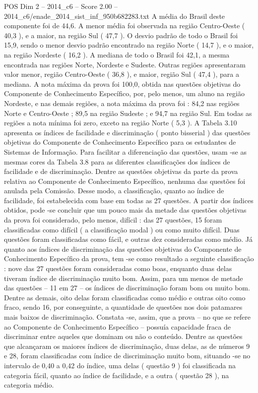 \begin{textsample}{POS Dim 2 – 2014\_c6 – Score 2.00 – 2014\_c6/enade\_2014\_sist\_inf\_950b682283.txt}
A média do Brasil deste componente foi de 44,6.
A menor média foi observada na região Centro-Oeste ( 40,3 ), e a maior, na região Sul ( 47,7 ).
O desvio padrão de todo o Brasil foi 15,9, sendo o menor desvio padrão encontrado na região Norte ( 14,7 ), e o maior, na região Nordeste ( 16,2 ).
A mediana de todo o Brasil foi 42,1, a mesma encontrada nas regiões Norte, Nordeste e Sudeste.
Outras regiões apresentaram valor menor, região Centro-Oeste ( 36,8 ), e maior, região Sul ( 47,4 ), para a mediana.
A nota máxima da prova foi 100,0, obtida nas questões objetivas do Componente de Conhecimento Específico, por, pelo menos, um aluno na região Nordeste, e nas demais regiões, a nota máxima da prova foi : 84,2 nas regiões Norte e Centro-Oeste ; 89,5 na região Sudeste ; e 94,7 na região Sul.
Em todas as regiões a nota mínima foi zero, exceto na região Norte ( 5,3 ).
A Tabela 3.10 apresenta os índices de facilidade e discriminação ( ponto bisserial ) das questões objetivas do Componente de Conhecimento Específico para os estudantes de Sistemas de Informação.
Para facilitar a diferenciação das questões, usam -se as mesmas cores da Tabela 3.8 para as diferentes classificações dos índices de facilidade e de discriminação.
Dentre as questões objetivas da parte da prova relativa ao Componente de Conhecimento Específico, nenhuma das questões foi anulada pela Comissão.
Desse modo, a classificação, quanto ao índice de facilidade, foi estabelecida com base em todas as 27 questões.
A partir dos índices obtidos, pode -se concluir que um pouco mais da metade das questões objetivas da prova foi considerado, pelo menos, difícil : das 27 questões, 15 foram classificadas como difícil ( a classificação modal ) ou como muito difícil.
Duas questões foram classificadas como fácil, e outras dez consideradas como médio.
Já quanto aos índices de discriminação das questões objetivas do Componente de Conhecimento Específico da prova, tem -se como resultado a seguinte classificação : nove das 27 questões foram consideradas como boas, enquanto duas delas tiveram índice de discriminação muito bom.
Assim, para um menos de metade das questões – 11 em 27 – os índices de discriminação foram bom ou muito bom.
Dentre as demais, oito delas foram classificadas como médio e outras oito como fraco, sendo 16, por conseguinte, a quantidade de questões nos dois patamares mais baixos de discriminação.
Constata -se, assim, que a prova – no que se refere ao Componente de Conhecimento Específico – possuía capacidade fraca de discriminar entre aqueles que dominam ou não o conteúdo.
Dentre as questões que alcançaram os maiores índices de discriminação, duas delas, as de números 9 e 28, foram classificadas com índice de discriminação muito bom, situando -se no intervalo de 0,40 a 0,42 do índice, uma delas ( questão 9 ) foi classificada na categoria fácil, quanto ao índice de facilidade, e a outra ( questão 28 ), na categoria médio.

\end{textsample}
